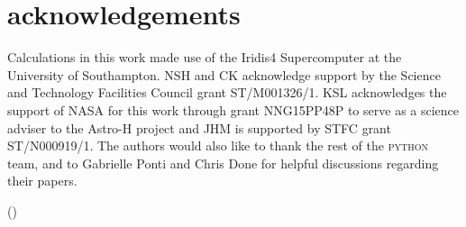 \documentclass[a4paper,fleqn,usenatbib]{mnras}
\begin{document}
\section{acknowledgements}
Calculations in this work made use of the Iridis4 Supercomputer at the
University of Southampton. NSH and CK  acknowledge support by the
Science and Technology Facilities Council grant ST/M001326/1.  
KSL acknowledges the support of NASA for this work through grant 
NNG15PP48P to serve as a 
science adviser to the Astro-H project and JHM is supported by STFC 
grant ST/N000919/1. The authors would
also like to thank the rest of the \textsc{python} team, and to Gabrielle Ponti 
and Chris Done for helpful discussions regarding their papers.





()
\label{lastpage}

\bsp	%
\end{document}
